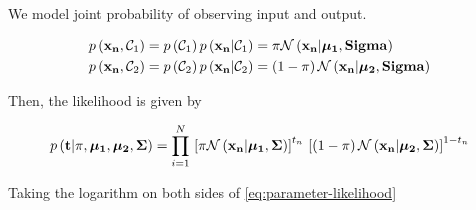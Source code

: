 \documentclass[twoside]{article}
\begin{document}
We model joint probability of observing input and output.

\begin{align}
    p\left(\boldsymbol{\mathbf{x_n}},\mathcal C_1\right) &= p\left(\mathcal C_1\right)p\left(\boldsymbol{\mathbf{x_n}}|\mathcal C_1\right) = \pi\mathcal N\left(\boldsymbol{\mathbf{x_n}}|\boldsymbol{\mathbf{\mu_1}},\boldsymbol{\mathbf{Sigma}}\right) \\
    p\left(\boldsymbol{\mathbf{x_n}},\mathcal C_2\right) &= p\left(\mathcal C_2\right)p\left(\boldsymbol{\mathbf{x_n}}|\mathcal C_2\right) = \left(1-\pi\right)\mathcal N\left(\boldsymbol{\mathbf{x_n}}|\boldsymbol{\mathbf{\mu_2}},\boldsymbol{\mathbf{Sigma}}\right)
\end{align}

Then, the likelihood is given by

\begin{equation}
    p\brak{\vec{t}|\pi,\vec{\mu_1},\vec{\mu_2},\vec{\Sigma}} = \prod_{i=1}^N\sbrak{\pi\cN\brak{\vec{x_n}|\vec{\mu_1},\vec{\Sigma}}}^{t_n}\sbrak{\brak{1-\pi}\cN\brak{\vec{x_n}|\vec{\mu_2},\vec{\Sigma}}}^{1-t_n}
    \label{eq:parameter-likelihood}
\end{equation}

Taking the logarithm on both sides of \eqref{eq:parameter-likelihood}
\end{document}
